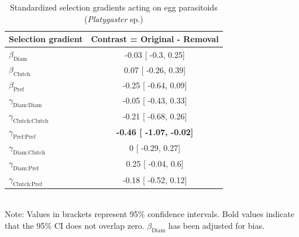 \documentclass[11pt,]{article}
\begin{document}
\begin{table}[h]
\caption{Standardized selection gradients acting on egg parasitoids (\textit{Platygaster} sp.)}
\label{Table:ExtendedGradients}
\centering
\begin{tabular}{lc}
\\ 
\hline
\textbf{Selection gradient} & \textbf{Contrast = Original - Removal}  \\ 
\hline
$\beta_{\text{Diam}}$ & 

-0.03 [
-0.3,
0.25] \\

$\beta_{\text{Clutch}}$ & 

0.07 [
-0.26,
0.39] \\

$\beta_{\text{Pref}}$ &

-0.25 [
-0.64,
0.09] \\

$\gamma_{\text{Diam:Diam}}$ &

-0.05 [
-0.43,
0.33] \\

$\gamma_{\text{Clutch:Clutch}}$ & 

-0.21 [
-0.68,
0.26] \\

$\gamma_{\text{Pref:Pref}}$ & 

\textbf{
-0.46 [
-1.07,
-0.02] }\\

$\gamma_{\text{Diam:Clutch}}$ & 

0 [
-0.29,
0.27] \\

$\gamma_{\text{Diam:Pref}}$ & 

0.25 [
-0.04,
0.6] \\

$\gamma_{\text{Clutch:Pref}}$ & 

-0.18 [
-0.52,
0.12] \\ 
\hline
\end{tabular}
\bigskip{}
\\
{\footnotesize Note: Values in brackets represent 95\% confidence intervals. Bold values indicate that the 95\% CI does not overlap zero. $\beta_{\text{Diam}}$ has been adjusted for bias.}
\end{table}

\bigskip
\end{document}
